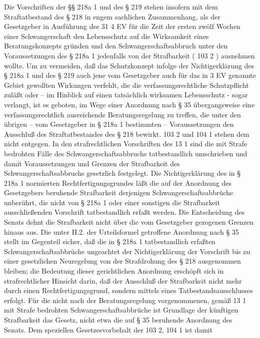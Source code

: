 \documentclass[12pt]{article}
\begin{document}
\begin{sourcepara}[title={原文E.266}]
Die Vorschriften der §§ 218a \abbrAbs{} 1 \abbrStGB{} \abbrNF{} und des § 219 \abbrStGB{} \abbrNF{} stehen insofern mit dem Straftatbestand des § 218 \abbrStGB{} \abbrNF{} in engem sachlichen Zusammenhang, als der Gesetzgeber in Ausführung des \abbrArt{} 31 \abbrAbs{} 4 EV für die Zeit der ersten zwölf Wochen einer Schwangerschaft den Lebensschutz auf die Wirksamkeit eines Beratungskonzepts gründen und den Schwangerschaftsabbruch unter den Voraussetzungen des § 218a \abbrAbs{} 1 \abbrStGB{} \abbrNF{} jedenfalls von der Strafbarkeit (\abbrArt{} 103 \abbrAbs{} 2 \abbrGG{}\ggfnArtOneZeroThreeTwoDE{}) ausnehmen wollte. Um zu vermeiden, daß das Schutzkonzept infolge der Nichtigerklärung des § 218a \abbrAbs{} 1 \abbrStGB{} \abbrNF{} und des § 219 \abbrStGB{} \abbrNF{} auch jene vom Gesetzgeber auch für das in \abbrArt{} 3 EV genannte Gebiet gewollten Wirkungen verfehlt, die die verfassungsrechtliche Schutzpflicht zuläßt oder -- im Hinblick auf einen tatsächlich wirksamen Lebensschutz - sogar verlangt, ist es geboten, im Wege einer Anordnung nach § 35 \abbrBVerfGG{} übergangsweise eine verfassungsrechtlich ausreichende Beratungsregelung zu treffen, die unter den übrigen -- vom Gesetzgeber in § 218a \abbrAbs{} 1 \abbrStGB{} \abbrNF{} bestimmten -- Voraussetzungen den Ausschluß des Straftatbestandes des § 218 \abbrStGB{} \abbrNF{} bewirkt. \abbrArt{} 103 \abbrAbs{} 2 und \abbrArt{} 104 \abbrAbs{} 1 \abbrGG{}\ggfnArtOneZeroFourOneDE{} stehen dem nicht entgegen. In den strafrechtlichen Vorschriften des \abbrArt{} 13 \abbrNr{} 1 \abbrSFHG{} sind die mit Strafe bedrohten Fälle des Schwangerschaftsabbruchs tatbestandlich umschrieben und damit Voraussetzungen und Grenzen der Strafbarkeit des Schwangerschaftsabbruchs gesetzlich festgelegt. Die Nichtigerklärung des in § 218a \abbrAbs{} 1 \abbrStGB{} \abbrNF{} normierten Rechtfertigungsgrundes läßt die auf der Anordnung des Gesetzgebers beruhende Strafbarkeit derjenigen Schwangerschaftsabbrüche unberührt, die nicht von § 218a \abbrAbs{} 1 \abbrStGB{} \abbrNF{} oder einer sonstigen die Strafbarkeit ausschließenden Vorschrift tatbestandlich erfaßt werden. Die Entscheidung des Senats dehnt die Strafbarkeit nicht über die vom Gesetzgeber gezogenen Grenzen hinaus aus. Die unter \abbrNr{} II.2. der Urteilsformel getroffene Anordnung nach § 35 \abbrBVerfGG{} stellt im Gegenteil sicher, daß die in § 218a \abbrAbs{} 1 \abbrStGB{} \abbrNF{} tatbestandlich erfaßten Schwangerschaftsabbrüche ungeachtet der Nichtigerklärung der Vorschrift bis zu einer gesetzlichen Neuregelung von der Strafdrohung des § 218 \abbrStGB{} \abbrNF{} ausgenommen bleiben; die Bedeutung dieser gerichtlichen Anordnung erschöpft sich in strafrechtlicher Hinsicht darin, daß der Ausschluß der Strafbarkeit nicht mehr durch einen Rechtfertigungsgrund, sondern mittels eines Tatbestandsausschlusses erfolgt. Für die nicht nach der Beratungsregelung vorgenommenen, gemäß \abbrArt{} 13 \abbrNr{} 1 \abbrSFHG{} mit Strafe bedrohten Schwangerschaftsabbrüche ist Grundlage der künftigen Strafbarkeit das Gesetz, nicht etwa die auf § 35 \abbrBVerfGG{} beruhende Anordnung des Senats. Dem speziellen Gesetzesvorbehalt der \abbrArt{} 103 \abbrAbs{} 2, 104 \abbrAbs{} 1 \abbrGG{} ist damit 
\end{sourcepara}
\end{document}
